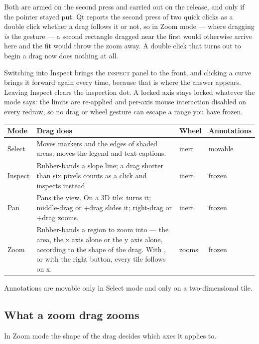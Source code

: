 \documentclass[11pt,a4paper,oneside]{report}
\newcommand{\key}[1]{\textsf{\small\fbox{#1}}}
\newcommand{\tab}[1]{\textsc{#1}}
\begin{document}
Both are armed on the second press and carried out on the release, and only if
the pointer stayed put. Qt reports the second press of two quick clicks as a
double click whether a drag follows it or not, so in Zoom mode --- where
dragging \emph{is} the gesture --- a second rectangle dragged near the first
would otherwise arrive here and the fit would throw the zoom away. A double
click that turns out to begin a drag now does nothing at all.

Switching into Inspect brings the \tab{inspect} panel to the front, and clicking
a curve brings it forward again every time, because that is where the answer
appears. Leaving Inspect clears the inspection dot. A locked axis stays locked
whatever the mode says: the limits are re-applied and per-axis mouse interaction
disabled on every redraw, so no drag or wheel gesture can escape a range you have
frozen.

\begin{center}
\small
\begin{tabular}{@{}p{}p{}p{}p{}@{}}
\toprule
\textbf{Mode} & \textbf{Drag does} & \textbf{Wheel} & \textbf{Annotations} \\
\midrule
Select & Moves markers and the edges of shaded areas; moves the legend and text captions. & inert & movable \\
Inspect & Rubber-bands a slope line; a drag shorter than six pixels counts as a click and inspects instead. & inert & frozen \\
Pan & Pans the view. On a 3D tile: turns it; middle-drag or \key{Shift}+drag slides it; right-drag or \key{Ctrl}+drag zooms. & inert & frozen \\
Zoom & Rubber-bands a region to zoom into --- the area, the x axis alone or the y axis alone, according to the shape of the drag. With \key{Ctrl}, or with the right button, every tile follows on x. & zooms & frozen \\
\bottomrule
\end{tabular}
\end{center}

Annotations are movable only in Select mode and only on a two-dimensional tile.

\subsection{What a zoom drag zooms}
\label{sec:zoomdrag}

In Zoom mode the shape of the drag decides which axes it applies to.
\end{document}
